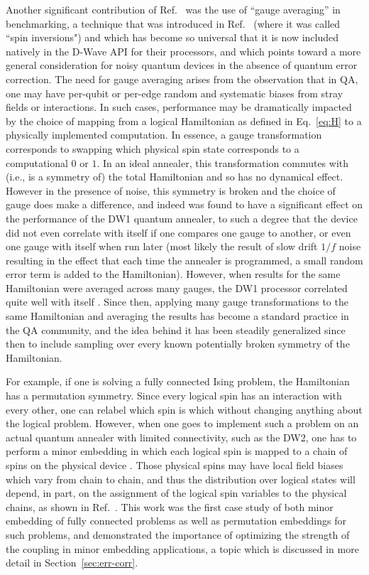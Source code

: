 Another significant contribution of Ref.~\cite{q108} was the use of ``gauge averaging'' in benchmarking, a technique that was introduced in Ref.~\cite{q-sig} (where it was called ``spin inversions") and which has become so universal that it is now included natively in the D-Wave API for their processors, and which points toward a more general consideration for noisy quantum devices in the absence of quantum error correction.
The need for gauge averaging arises from the observation that in QA, one may have per-qubit or per-edge random and systematic biases from stray fields or interactions.
In such cases, performance may be dramatically impacted by the choice of mapping from a logical Hamiltonian as defined in Eq.~\eqref{eq:H} to a physically implemented computation.
In essence, a gauge transformation corresponds to swapping which physical spin state corresponds to a computational $0$ or $1$. In an ideal annealer, this transformation commutes with (i.e., is a symmetry of) the total Hamiltonian and so has no dynamical effect. However in the presence of noise, this symmetry is broken and the choice of gauge does make a difference, and indeed was found to have a significant effect on the performance of the DW1 quantum annealer, to such a degree that the device did not even correlate with itself if one compares one gauge to another, or even one gauge with itself when run later (most likely the result of slow drift $1/f$ noise resulting in the effect that each time the annealer is programmed, a small random error term is added to the Hamiltonian). However, when results for the same Hamiltonian were averaged across many gauges, the DW1 processor correlated quite well with itself \cite{q108}. Since then, applying many gauge transformations to the same Hamiltonian and averaging the results has become a standard practice in the QA community, and the idea behind it has been steadily generalized since then to include sampling over every known potentially broken symmetry of the Hamiltonian.

For example, if one is solving a fully connected Ising problem, the Hamiltonian has a permutation symmetry. Since every logical spin has an interaction with every other, one can relabel which spin is which without changing anything about the logical problem. However, when one goes to implement such a problem on an actual quantum annealer with limited connectivity, such as the DW2, one has to perform a minor embedding in which each logical spin is mapped to a chain of spins on the physical device \cite{Choi1,Choi2}. Those physical spins may have local field biases which vary from chain to chain, and thus the distribution over logical states will depend, in part, on the assignment of the logical spin variables to the physical chains, as shown in Ref.~\cite{Venturelli:2014nx}. This work was the first case study of both minor embedding of fully connected problems as well as permutation embeddings for such problems, and demonstrated the importance of optimizing the strength of the coupling in minor embedding applications, a topic which is discussed in more detail in Section~\ref{sec:err-corr}.

